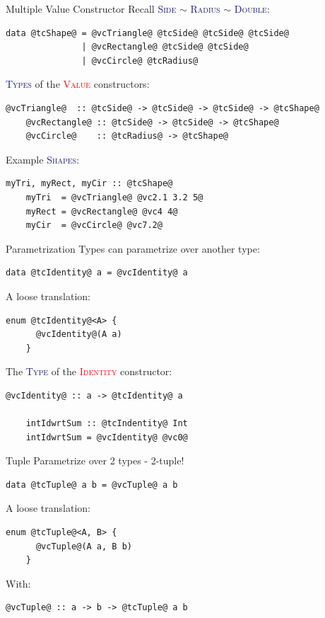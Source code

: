 \documentclass[xcolor={usenames,dvipsnames}]{beamer}
\newcommand{\htycon}[1]{\textcolor{MidnightBlue}{\textsc{#1}}}
\newcommand{\hvalcon}[1]{\textcolor{Red}{\textsc{#1}}}
\begin{document}
\begin{frame}[fragile]{Multiple Value Constructor}
  Recall \htycon{Side} $\sim$ \htycon{Radius} $\sim$ \htycon{Double}:
  \begin{lstlisting}[style=hask]
    data @tcShape@ = @vcTriangle@ @tcSide@ @tcSide@ @tcSide@
               | @vcRectangle@ @tcSide@ @tcSide@
               | @vcCircle@ @tcRadius@
  \end{lstlisting}

  \pause
  \htycon{Types} of the \hvalcon{Value} constructors:
  \begin{lstlisting}[style=hask]
    @vcTriangle@  :: @tcSide@ -> @tcSide@ -> @tcSide@ -> @tcShape@
    @vcRectangle@ :: @tcSide@ -> @tcSide@ -> @tcShape@
    @vcCircle@    :: @tcRadius@ -> @tcShape@
  \end{lstlisting}

  \pause
  Example \htycon{Shapes}:
  \begin{lstlisting}[style=hask]
    myTri, myRect, myCir :: @tcShape@
    myTri  = @vcTriangle@ @vc2.1 3.2 5@
    myRect = @vcRectangle@ @vc4 4@
    myCir  = @vcCircle@ @vc7.2@
  \end{lstlisting}
\end{frame}

\begin{frame}[fragile]{Parametrization}
  Types can parametrize over another type:
  \begin{lstlisting}[style=hask]
    data @tcIdentity@ a = @vcIdentity@ a
  \end{lstlisting}

  \pause
  A loose translation:
  \begin{lstlisting}[style=hask]
    enum @tcIdentity@<A> {
      @vcIdentity@(A a)
    }
  \end{lstlisting}

  \pause
  The \htycon{Type} of the \hvalcon{Identity} constructor:
  \begin{lstlisting}[style=hask]
    @vcIdentity@ :: a -> @tcIdentity@ a

    intIdwrtSum :: @tcIndentity@ Int
    intIdwrtSum = @vcIdentity@ @vc0@
  \end{lstlisting}
\end{frame}

\begin{frame}[fragile]{Tuple}
  Parametrize over 2 types - 2-tuple!
  \begin{lstlisting}[style=hask]
    data @tcTuple@ a b = @vcTuple@ a b
  \end{lstlisting}

  \pause
  A loose translation:
  \begin{lstlisting}[style=hask]
    enum @tcTuple@<A, B> {
      @vcTuple@(A a, B b)
    }
  \end{lstlisting}

  \pause
  With:
  \begin{lstlisting}[style=hask]
    @vcTuple@ :: a -> b -> @tcTuple@ a b
  \end{lstlisting}
\end{frame}
\end{document}

